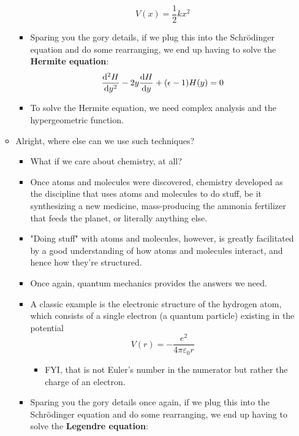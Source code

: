 \documentclass[../finalProject.tex]{subfiles}
\begin{document}
\begin{itemize}
\begin{itemize}
\begin{itemize}
            \begin{equation*}
                V(x) = \frac{1}{2}kx^2
            \end{equation*}
            \item Sparing you the gory details, if we plug this into the Schr\"{o}dinger equation and do some rearranging, we end up having to solve the \textbf{Hermite equation}:
            \begin{equation*}
                \dv[2]{H}{y}-2y\dv{H}{y}+(\epsilon-1)H(y) = 0
            \end{equation*}
            \item To solve the Hermite equation, we need complex analysis and the hypergeometric function.
        \end{itemize}
        \item Alright, where else can we use such techniques?
        \begin{itemize}
            \item What if we care about chemistry, at all?
            \item Once atoms and molecules were discovered, chemistry developed as the discipline that uses atoms and molecules to do stuff, be it synthesizing a new medicine, mass-producing the ammonia fertilizer that feeds the planet, or literally anything else.
            \item "Doing stuff" with atoms and molecules, however, is greatly facilitated by a good understanding of how atoms and molecules interact, and hence how they're structured.
            \item Once again, quantum mechanics provides the answers we need.
            \item A classic example is the electronic structure of the hydrogen atom, which consists of a single electron (a quantum particle) existing in the potential
            \begin{equation*}
                V(r) = -\frac{e^2}{4\pi\varepsilon_0r}
            \end{equation*}
            \begin{itemize}
                \item FYI, that is not Euler's number in the numerator but rather the charge of an electron.
            \end{itemize}
            \item Sparing you the gory details once again, if we plug this into the Schr\"{o}dinger equation and do some rearranging, we end up having to solve the \textbf{Legendre equation}:

\end{itemize}
\end{itemize}
\end{itemize}
\end{document}
